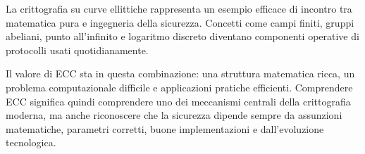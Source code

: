 \documentclass[12pt,a4paper,oneside]{report}
\begin{document}
La crittografia su curve ellittiche rappresenta un esempio efficace di incontro tra matematica pura e ingegneria della sicurezza. Concetti come campi finiti, gruppi abeliani, punto all'infinito e logaritmo discreto diventano componenti operative di protocolli usati quotidianamente.

Il valore di ECC sta in questa combinazione: una struttura matematica ricca, un problema computazionale difficile e applicazioni pratiche efficienti. Comprendere ECC significa quindi comprendere uno dei meccanismi centrali della crittografia moderna, ma anche riconoscere che la sicurezza dipende sempre da assunzioni matematiche, parametri corretti, buone implementazioni e dall'evoluzione tecnologica.


\printbibliography
\end{document}
